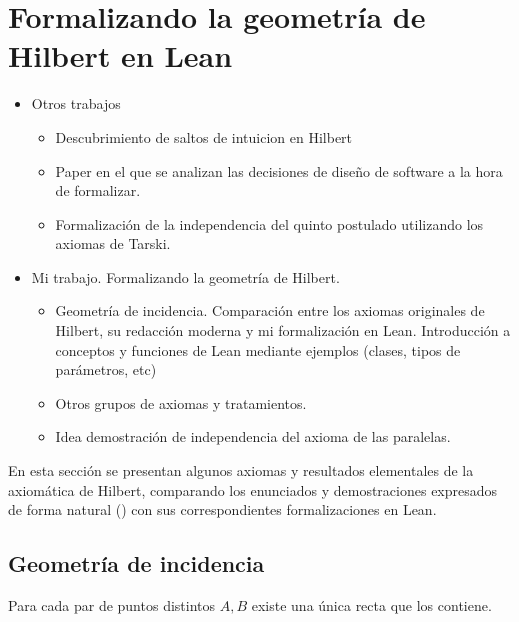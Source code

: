 \section{Formalizando la geometría de Hilbert en Lean}
\begin{itemize}
	\item Otros trabajos
	      \begin{itemize}
		      \item Descubrimiento de saltos de intuicion en Hilbert
		      \item Paper en el que se analizan las decisiones de diseño de
		            software a la hora de formalizar.
		      \item Formalización de la independencia del quinto postulado
		            utilizando los axiomas de Tarski.
	      \end{itemize}
	\item Mi trabajo. Formalizando la geometría de Hilbert.
	      \begin{itemize}

		      \item Geometría de incidencia. Comparación entre los
		            axiomas originales de Hilbert, su redacción moderna y
		            mi formalización en Lean. Introducción a conceptos
		            y funciones de Lean mediante ejemplos (clases,
		            tipos de parámetros, etc)
		      \item Otros grupos de axiomas y tratamientos.
		      \item Idea demostración de independencia del axioma de
		            las paralelas.
	      \end{itemize}
\end{itemize}

En esta sección se presentan algunos axiomas y resultados elementales de la
axiomática de Hilbert, comparando los enunciados y demostraciones expresados de
forma natural () con sus correspondientes
formalizaciones en Lean.

\subsection{Geometría de incidencia}



\begin{ax}\label{I1}
	Para cada par de puntos distintos $A, B$ existe una única recta que los
	contiene.
\end{ax}

